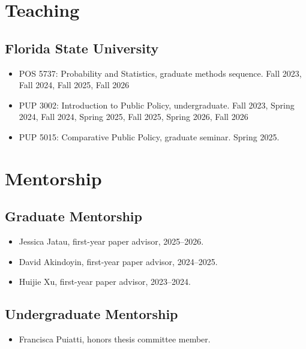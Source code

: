 \documentclass[10pt]{article}
\begin{document}
\section{Teaching}

\subsection{Florida State University}
\begin{itemize}
    \item POS 5737: Probability and Statistics, graduate methods sequence. Fall 2023, Fall 2024, Fall 2025, Fall 2026
    \item PUP 3002: Introduction to Public Policy, undergraduate. Fall 2023, Spring 2024, Fall 2024, Spring 2025, Fall 2025, Spring 2026, Fall 2026
    \item PUP 5015: Comparative Public Policy, graduate seminar. Spring 2025.
\end{itemize}


\section{Mentorship}
\subsection{Graduate Mentorship}
\begin{itemize}
    \item Jessica Jatau, first-year paper advisor, 2025--2026.
    \item David Akindoyin, first-year paper advisor, 2024--2025.
    \item Huijie Xu, first-year paper advisor, 2023--2024.
\end{itemize}

\subsection{Undergraduate Mentorship}
\begin{itemize}
    \item Francisca Puiatti, honors thesis committee member.
\end{itemize}
\end{document}
